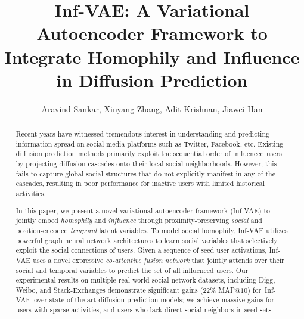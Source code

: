\documentclass[sigconf]{acmart}
\newcommand{\name}{Inf-VAE}
\begin{document}
\fancyhead{}
\title{Inf-VAE: A Variational Autoencoder Framework to Integrate Homophily and Influence in Diffusion Prediction}



\author{\vspace{-10pt}Aravind Sankar, Xinyang Zhang, Adit Krishnan, Jiawei Han}

\renewcommand{\authors}{Aravind Sankar, Xinyang Zhang, Adit Krishnan, Jiawei Han}

\renewcommand{\algorithmicrequire}{\textbf{Input:}}
\renewcommand{\algorithmicensure}{\textbf{Output:}}
\renewcommand{\citep}{\cite}

\makeatletter
\newcommand{\algmargin}{\the\ALG@thistlm}
\makeatother
\begin{abstract}
Recent years have witnessed
tremendous interest in understanding and predicting information spread on 
social media platforms such as Twitter, Facebook, etc.
Existing diffusion prediction methods primarily exploit the sequential order of influenced users by projecting diffusion cascades onto their local social neighborhoods.
However, this fails to capture global social structures that do not explicitly manifest in any of the cascades, resulting in poor performance for inactive users with limited historical activities.


In this paper, we present a novel variational autoencoder framework (\name) to jointly embed
\textit{homophily} and \textit{influence} through proximity-preserving \emph{social} and position-encoded \emph{temporal} latent variables. To model social homophily, Inf-VAE utilizes powerful graph neural network architectures to learn social variables that selectively exploit the social connections of users.
Given a sequence of seed user activations, Inf-VAE uses a novel expressive \textit{co-attentive fusion network} that jointly attends over their social and temporal variables to predict the set of all influenced users. 
Our experimental results on multiple real-world social network datasets, including Digg, Weibo, and Stack-Exchanges demonstrate significant gains (22\% MAP$@10$) for~\name~over state-of-the-art diffusion prediction models; we achieve massive gains for users with sparse activities, and users who lack direct social neighbors in seed sets.

\end{abstract}
\end{document}
